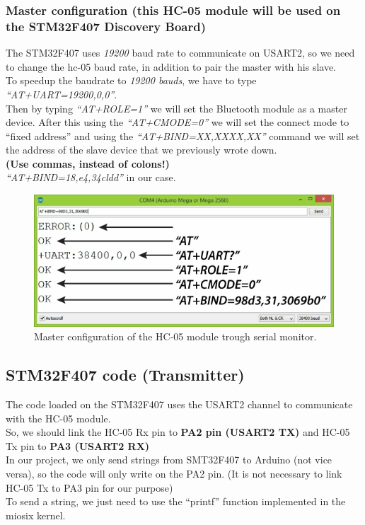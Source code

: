 \subsubsection{Master configuration (this HC-05 module will be used on the STM32F407 Discovery Board)}
The STM32F407 uses \textit{19200} baud rate to communicate on USART2, so we need to change the hc-05 baud rate, in addition to pair the master with his slave.\\
To speedup the baudrate to \textit{19200 bauds}, we have to type \textit{“AT+UART=19200,0,0”}.\\
Then by typing \textit{“AT+ROLE=1”} we will set the Bluetooth module as a master device. After this using the \textit{“AT+CMODE=0”} we will set the connect mode to “fixed address” and using the \textit{“AT+BIND=XX,XXXX,XX”} command we will set the address of the slave device that we previously wrote down.\\ \textbf{(Use commas, instead of colons!)}\\
\textit{“AT+BIND=18,e4,34cldd”} in our case.\\
\begin{figure}[H]
	\centering
	\includegraphics[width=\textwidth]
	{files/images/hc05_master}
	\caption{Master configuration of the HC-05 module trough serial monitor.}
\end{figure}
 
\subsection{STM32F407 code (Transmitter)}
The code loaded on the STM32F407 uses the USART2 channel to communicate with the HC-05 module.\\
So, we should link the HC-05 Rx pin to \textbf{PA2 pin (USART2 TX)} and HC-05 Tx pin to \textbf{PA3 (USART2 RX)}\\
In our project, we only send strings from SMT32F407 to Arduino (not vice versa), so the code will only write on the PA2 pin. (It is not necessary to link HC-05 Tx to PA3 pin for our purpose)\\
To send a string, we just need to use the “printf” function implemented in the miosix kernel.\\
